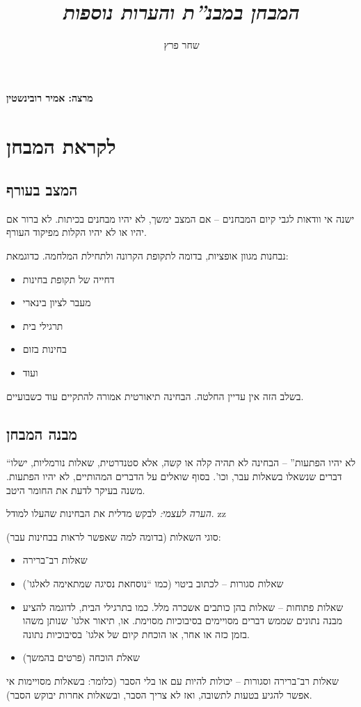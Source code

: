 \documentclass[]{article}
\author{שחר פרץ}
\title{\textit{המבחן במבנ''ת והערות נוספות}}
\theoremstyle{definition}
\begin{document}
	\maketitle
	\textbf{מרצה: אמיר רובינשטין}
	
	\section{לקראת המבחן}
	
	\subsection{המצב בעורף}
	ישנה אי וודאות לגבי קיום המבחנים – אם המצב ימשך, לא יהיו מבחנים בכיתות. לא ברור אם יהיו או לא יהיו הקלות מפיקוד העורף. 
	
	נבחנות מגוון אופציות, בדומה לתקופת הקרונה ולתחילת המלחמה. כדוגמאת: 
	\begin{itemize}
		\item דחייה של תקופת בחינות
		\item מעבר לציון בינארי
		\item תרגילי בית
		\item בחינות בזום
		\item ועוד
	\end{itemize}
	
	בשלב הזה אין עדיין החלטה. הבחינה תיאורטית אמורה להתקיים עוד כשבועיים. 
	
	\subsection{מבנה המבחן}
	``לא יהיו הפתעות'' – הבחינה לא תהיה קלה או קשה, אלא סטנדרטית, שאלות נורמליות, ישלו דברים שנשאלו בשאלות עבר, וכו'. 
	בסוף שואלים על הדברים המהותיים, לא יהיו הפתעות. משנה בעיקר לדעת את החומר היטב. 
	
	\textit{הערה לעצמי: }לבקש מדלית את הבחינות שהעלו למודל. zz
	
	סוגי השאלות (בדומה למה שאפשר לראות בבחינות עבר): 
	\begin{itemize}
		\item שאלות רב־ברירה
		\item שאלות סגורות – לכתוב ביטוי (כמו ``נוסחאת נסיגה שמתאימה לאלגו')
		\item שאלות פתוחות – שאלות בהן כותבים אשכרה מלל. כמו בתרגילי הבית, לדוגמה להציע מבנה נתונים שממש דברים מסויימים בסיבוכיות מסוימת. או, תיאור אלגו' שנותן משהו בזמן כזה או אחר, או הוכחת קיום של אלגו' בסיבוכיות נתונה. 
		\item שאלת הוכחה (פרטים בהמשך)
	\end{itemize}
	שאלות רב־ברירה וסגורות – יכולות להיות עם או בלי הסבר (כלומר: בשאלות מסויימות אי אפשר להגיע בטעות לתשובה, ואז לא צריך הסבר, ובשאלות אחרות יבוקש הסבר). 
	
\end{document}
